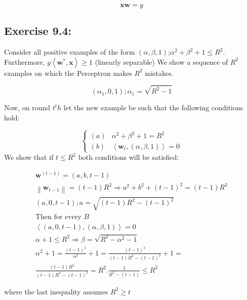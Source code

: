 \documentclass[]{book}
\begin{document}
\begin{equation*}
    \textbf{x}\textbf{w}=y
\end{equation*}

\subsection*{Exercise 9.4:}
Consider all positive examples of the form $(\alpha,\beta,1)$;\hspace{0.2cm}$\alpha^2+\beta^2+1\leq R^2$. 
Furthermore, $y\left \langle \textbf{w}^*,\textbf{x} \right \rangle\geq 1$ (linearly separable)
We show a sequence of $R^2$ examples on which the Perceptron makes $R^2$  mistakes.

\begin{equation*}
    (\alpha_1,0,1);\alpha_1=\sqrt{R^2-1}
\end{equation*}

Now, on round $t^th$ let the new example be such that the following conditions hold:

\begin{equation*}
    \left\{\begin{matrix}
(a) & \alpha^2+\beta^2+1=R^2\\ 
(b) & \left \langle \textbf{w}_t,(\alpha , \beta ,1) \right \rangle=0
\end{matrix}\right.
\end{equation*}
 We show that if $t\leq R^2$  both conditions will be  satisfied:

\begin{align*}
    \textbf{w}^{(t-1)}=(a,b,t-1)\\
\left \| \textbf{w}_{t-1} \right \|=(t-1)R^2\Rightarrow a^2+b^2+(t-1)^2=(t-1)R^2\\
(a,0,t-1);a=\sqrt{(t-1)R^2-(t-1)^2} \\
\text{Then for every $B$} \\
\left \langle (a,0,t-1),(\alpha , \beta ,1) \right \rangle =0\\
\alpha +1\leq R^2 \Rightarrow \beta=\sqrt{R^2-\alpha^2-1}\\
\alpha^2+1=\frac{(t-1)^2}{\alpha^2}+1=\frac{(t-1)^2}{(t-1)R^2-(t-1)^2}+1=\\
\frac{(t-1)R^2}{(t-1)R^2-(t-1)^2}=R^2.\frac{1}{R^2-(t-1)}\leq R^2
\end{align*}

where the last inequality assumes $R^2 \geq t$
\end{document}
